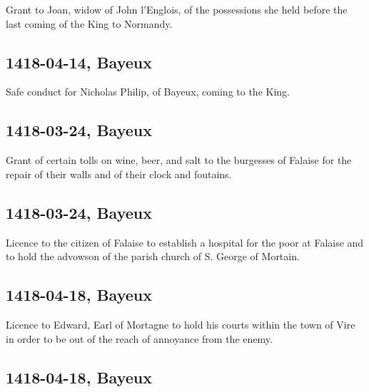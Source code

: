 \documentclass[a4paper,12pt,twoside]{book}
\begin{document}
                
                     Grant to Joan, widow of John l'Englois, of the possessions she held before the last coming of the King to Normandy.
                  
                
                \subsection{1418-04-14, Bayeux}
                
                
                     Safe conduct for Nicholas Philip, of Bayeux, coming to the King.
                  
                
                \subsection{1418-03-24, Bayeux}
                
                
                     Grant of certain tolls on wine, beer, and salt to the burgesses of Falaise for the repair of their walls and of their clock and foutains.
                  
                
                \subsection{1418-03-24, Bayeux}
                
                
                     Licence to the citizen of Falaise to establish a hospital for the poor at Falaise and to hold the advowson of the parish church of S. George of Mortain.
                  
                
                \subsection{1418-04-18, Bayeux}
                
                
                     Licence to Edward, Earl of Mortagne to hold his courts within the town of Vire in order to be out of the reach of annoyance from the enemy.
                  
                
                \subsection{1418-04-18, Bayeux}
                
\end{document}
